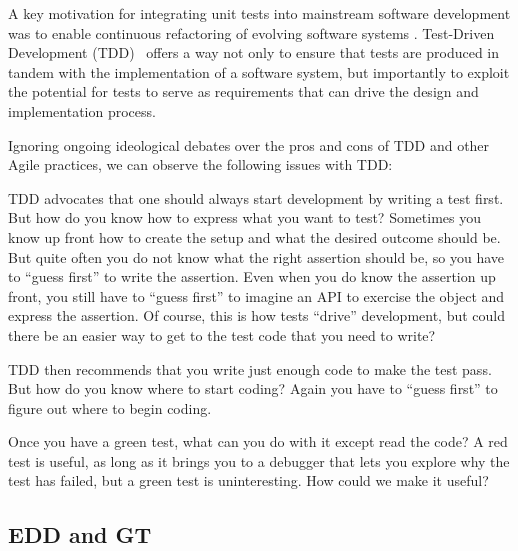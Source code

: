 \documentclass[acmsmall,screen,authorversion,nonacm]{acmart} %
\begin{document}
A key motivation for integrating unit tests into mainstream software development was to enable continuous refactoring of evolving software systems \cite{Beck00a}.
Test-Driven Development (TDD)~\cite{Beck03a} offers a way not only to ensure that tests are produced in tandem with the implementation of a software system, but importantly to exploit the potential for tests to serve as requirements that can drive the design and implementation process.

Ignoring ongoing ideological debates over the pros and cons of TDD and other Agile practices, we can observe the following issues with TDD:
\begin{inparaenum}[(i)]
	\item TDD advocates that one should always start development by writing a test first.
But how do you know how to express what you want to test?
Sometimes you know up front how to create the setup and what the desired outcome should be.
But quite often you do not know what the right assertion should be, so you have to ``guess first'' to write the assertion.
Even when you do know the assertion up front, you still have to ``guess first'' to imagine an API to exercise the object and express the assertion.
Of course, this is how tests ``drive'' development, but could there be an easier way to get to the test code that you need to write?
	\item TDD then recommends that you write just enough code to make the test pass.
But how do you know where to start coding?
Again you have to ``guess first'' to figure out where to begin coding.
	\item Once you have a green test, what can you do with it except read the code?
A red test is useful, as long as it brings you to a debugger that lets you explore why the test has failed, but a green test is uninteresting.
How could we make it useful?
\end{inparaenum}

\subsection{EDD and GT}
\end{document}

